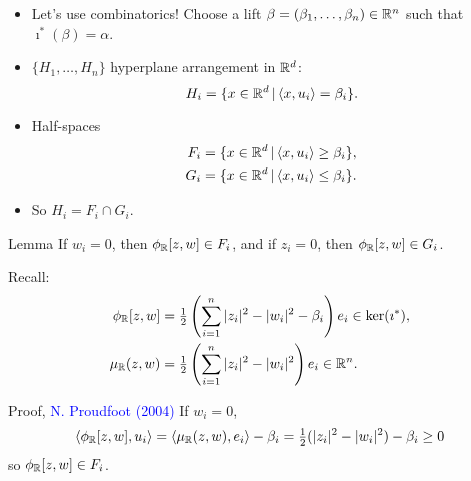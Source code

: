 \begin{frame}
    \begin{itemize}
    \item Let's use combinatorics! Choose a lift $\beta = (\beta_{1}, \ldots, \beta_{n}) \in \mathbb{R}^{n}$ such that $\imath^{\ast}(\beta) = \alpha$.
    \item $\{H_{1}, \ldots, H_{n}\}$ hyperplane arrangement in $\mathbb{R}^{d}$:
    \[
        H_{i} = \{x \in \mathbb{R}^{d}\, |\, \langle x, u_{i} \rangle = \beta_{i} \}.
    \]
    \item Half-spaces
    \begin{align*}
        F_{i} &= \{x \in \mathbb{R}^{d}\, |\, \langle x, u_{i} \rangle \geq \beta_{i} \}, \\
        G_{i} &= \{x \in \mathbb{R}^{d}\, |\, \langle x, u_{i} \rangle \leq \beta_{i} \}.
    \end{align*}
    \item So $H_{i} = F_{i} \cap G_{i}$.
    \end{itemize}
\end{frame}

\begin{frame}
    \begin{block}{Lemma}
        If $w_{i} = 0$, then $\phi_{\mathbb{R}}[z,w] \in F_{i}$, and if $z_{i} = 0$, then $\phi_{\mathbb{R}}[z,w] \in G_{i}$.
    \end{block}
    Recall:
    \begin{align*}
        \phi_{\mathbb{R}}[z,w] &= \tfrac{1}{2}\left(\sum_{i=1}^{n} |z_{i}|^{2} - |w_{i}|^{2} - \beta_{i} \right)e_{i} \in \ker(\imath^{\ast}), \\
        \mu_{\mathbb{R}}(z,w) &= \tfrac{1}{2}\left(\sum_{i=1}^{n} |z_{i}|^{2} - |w_{i}|^{2}\right)e_{i} \in \mathbb{R}^{n}.
    \end{align*}
    \begin{block}{Proof, \textcolor{blue}{N. Proudfoot (2004)}}
        If $w_{i} = 0$, 
        \[
            \langle \phi_{\mathbb{R}}[z,w], u_{i} \rangle = \langle \mu_{\mathbb{R}}(z,w), e_{i} \rangle - \beta_{i} = \tfrac{1}{2}(|z_{i}|^{2} - |w_{i}|^{2}) - \beta_{i} \geq 0
        \]
        so $\phi_{\mathbb{R}}[z,w] \in F_{i}$.
    \end{block}
\end{frame}

